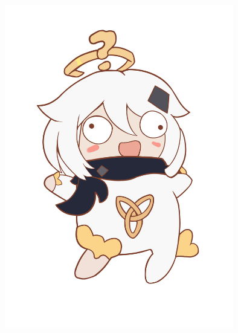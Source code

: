 \documentclass[UTF8, 12pt, A4paper]{article}
\begin{document}
\begin{figure}[ht]
    \centering
    \includegraphics[width=10cm]{emergency-food.png}
\end{figure}
\end{document}
